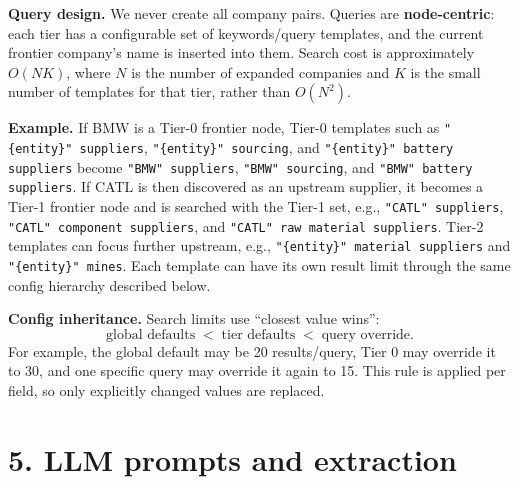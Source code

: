\documentclass[10pt,a4paper]{article}
\begin{document}
\begin{briefbox}
\small
\textbf{Query design.} We never create all company pairs. Queries are \textbf{node-centric}: each tier has a configurable set of keywords/query templates, and the current frontier company's name is inserted into them. Search cost is approximately $O(NK)$, where $N$ is the number of expanded companies and $K$ is the small number of templates for that tier, rather than $O(N^2)$.

\textbf{Example.} If BMW is a Tier-0 frontier node, Tier-0 templates such as \texttt{"\{entity\}" suppliers}, \texttt{"\{entity\}" sourcing}, and \texttt{"\{entity\}" battery suppliers} become \texttt{"BMW" suppliers}, \texttt{"BMW" sourcing}, and \texttt{"BMW" battery suppliers}. If CATL is then discovered as an upstream supplier, it becomes a Tier-1 frontier node and is searched with the Tier-1 set, e.g., \texttt{"CATL" suppliers}, \texttt{"CATL" component suppliers}, and \texttt{"CATL" raw material suppliers}. Tier-2 templates can focus further upstream, e.g., \texttt{"\{entity\}" material suppliers} and \texttt{"\{entity\}" mines}. Each template can have its own result limit through the same config hierarchy described below.
\end{briefbox}

\textbf{Config inheritance.} Search limits use ``closest value wins'':
\[
\text{global defaults} \;<\; \text{tier defaults} \;<\; \text{query override}.
\]
For example, the global default may be 20 results/query, Tier 0 may override it to 30, and one specific query may override it again to 15. This rule is applied per field, so only explicitly changed values are replaced.

\section{5. LLM prompts and extraction}
\end{document}
